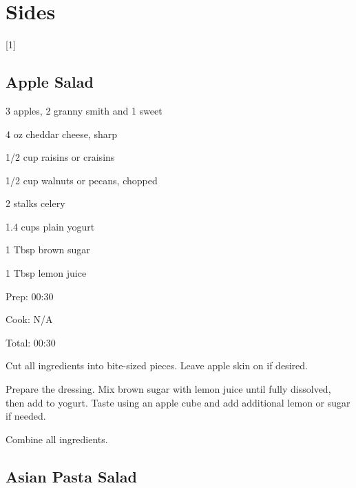 \documentclass[oneside]{book}  %
\def\thisrecipe{}  %
\newcommand{\chapterrec}[1]{  %
  \newpage \def\thisrecipe{} \chapter{#1} \vspace{1.1em}
}
\newcommand{\chaptertoc}[1]{  %
  \chapterrec{#1} \vspace{-1.1em}  %
  \startcontents[chapters] \printcontents[chapters]{chapter_toc_}{1}[1]{}
}
\newcommand{\recipe}[1]{\section{#1}\def\thisrecipe{: #1}} %
\begin{document}
\chaptertoc{Sides} \label{chap:sides}
\recipe{Apple Salad} \label{recipe:apple_salad} %

\begin{IT}
  \begin{ingredients}
  \item[3] apples, 2 granny smith and 1 sweet
  \item[4 oz] cheddar cheese, sharp
  \item[1/2 cup] raisins or craisins
  \item[1/2 cup] walnuts or pecans, chopped
  \item[2 stalks] celery
  \item[1.4 cups] plain yogurt
  \item[1 Tbsp] brown sugar
  \item[1 Tbsp] lemon juice
  \end{ingredients}

  \switchcolumn

  \begin{timeline}
    \item[Prep:]  00:30
    \item[Cook:]  N/A
    \item[Total:] 00:30
  \end{timeline}
\end{IT}

\begin{directions}
  \item Cut all ingredients into bite-sized pieces. Leave apple skin on if
  desired.

  \item Prepare the dressing. Mix brown sugar with lemon juice until fully
  dissolved, then add to yogurt. Taste using an apple cube and add additional
  lemon or sugar if needed.

  \item Combine all ingredients.
\end{directions}
\recipe{Asian Pasta Salad} \label{recipe:asian_pasta_salad} %
 
\end{document}
